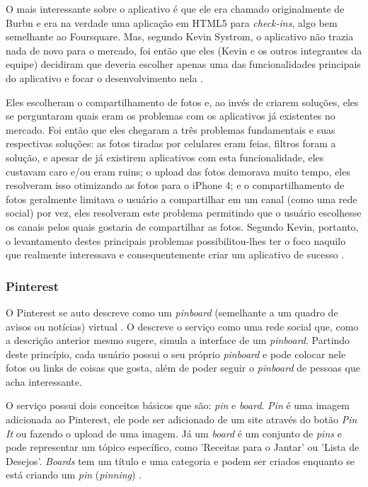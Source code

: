 \documentclass[diss]{template/setrem}
\begin{document}
O mais interessante sobre o aplicativo é que ele era chamado originalmente de Burbn e era na verdade uma aplicação em HTML5 para \emph{check-ins}, algo bem semelhante ao Foursquare. Mas, segundo Kevin Systrom, o aplicativo não trazia nada de novo para o mercado, foi então que eles (Kevin e os outros integrantes da equipe) decidiram que deveria escolher apenas uma das funcionalidades principais do aplicativo e focar o desenvolvimento nela \citep{Sawers2011}.

Eles escolheram o compartilhamento de fotos e, ao invés de criarem soluções, eles se perguntaram quais eram os problemas com os aplicativos já existentes no mercado. Foi então que eles chegaram a três problemas fundamentais e suas respectivas soluções: as fotos tiradas por celulares eram feias, filtros foram a solução, e apesar de já existirem aplicativos com esta funcionalidade, eles custavam caro e/ou eram ruins; o upload das fotos demorava muito tempo, eles resolveram isso otimizando as fotos para o iPhone 4; e o compartilhamento de fotos geralmente limitava o usuário a compartilhar em um canal (como uma rede social) por vez, eles resolveram este problema permitindo que o usuário escolhesse os canais pelos quais gostaria de compartilhar as fotos. Segundo Kevin, portanto, o levantamento destes principais problemas possibilitou-lhes ter o foco naquilo que realmente interessava e consequentemente criar um aplicativo de sucesso \citep{Sawers2011}.

\subsubsection{Pinterest}
O Pinterest se auto descreve como um \emph{pinboard} (semelhante a um quadro de avisos ou notícias) virtual \citep{Pinterest2012}. O \citet{CrunchBase2012d} descreve o serviço como uma rede social que, como a descrição anterior mesmo sugere, simula a interface de um \emph{pinboard}. Partindo deste princípio, cada usuário possui o seu próprio \emph{pinboard} e pode colocar nele fotos ou links de coisas que gosta, além de poder seguir o \emph{pinboard} de pessoas que acha interessante.

O serviço possui dois conceitos básicos que são: \emph{pin} e \emph{board}. \emph{Pin} é uma imagem adicionada ao Pinterest, ele pode ser adicionado de um site através do botão \emph{Pin It} ou fazendo o upload de uma imagem. Já um \emph{board} é um conjunto de \emph{pins} e pode representar um tópico específico, como 'Receitas para o Jantar' ou 'Lista de Desejos'. \emph{Boards} tem um título e uma categoria e podem ser criados enquanto se está criando um \emph{pin} (\emph{pinning}) \citep{Pinterest2012}.
\end{document}
